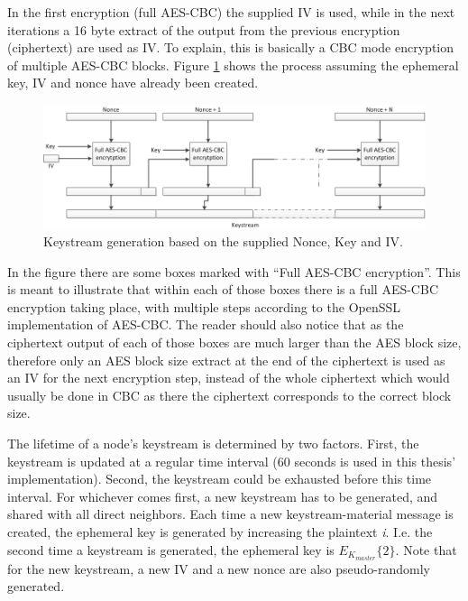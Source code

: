 In the first encryption (full AES-CBC) the supplied \ac{IV} is used, while in
the next iterations a 16 byte extract of the output from the previous encryption
(ciphertext) are used as \ac{IV}. To explain, this is basically a \ac{CBC} mode
encryption of multiple AES-CBC blocks. Figure \ref{fig:keystream_generation}
shows the process assuming the ephemeral key, IV and nonce have already been
created.

\begin{figure}[h]
	\centering
  	\includegraphics[width=\textwidth]{images/keystream_generation.png}
  	\caption{Keystream generation based on the supplied Nonce, Key and IV.}
	\label{fig:keystream_generation}
\end{figure}

In the figure there are some boxes marked with ``Full AES-CBC encryption''. This
is meant to illustrate that within each of those boxes there is a full AES-CBC
encryption taking place, with multiple steps according to the OpenSSL
implementation of AES-CBC. The reader should also notice that as the ciphertext
output of each of those boxes are much larger than the AES block size,
therefore only an AES block size extract at the end of the ciphertext is used
as an \ac{IV} for the next encryption step, instead of the whole ciphertext
which would usually be done in CBC as there the ciphertext corresponds to the
correct block size.

The lifetime of a node's keystream is determined by two factors. First, the
keystream is updated at a regular time interval (60 seconds is used in this
thesis' implementation). Second, the keystream could be exhausted before this
time interval. For whichever comes first, a new keystream has to be generated,
and shared with all direct neighbors. Each time a new keystream-material message
is created, the ephemeral key is generated by increasing the plaintext \emph{i}.
I.e. the second time a keystream is generated, the ephemeral key is
$E_{K_{master}}\{2\}$. Note that for the new keystream, a new IV and a new nonce
are also pseudo-randomly generated.

